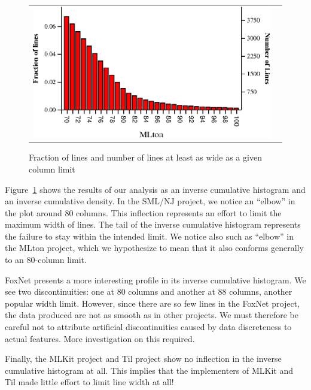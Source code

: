 \documentclass[12pt,abstracton]{scrartcl}
\begin{document}
\begin{figure}[h!]
\begin{tabular}{cc}
\includegraphics[scale=0.68]{mlton.eps} &
\end{tabular}
\caption{Fraction of lines and number of lines at least as wide as a given column limit}
\label{fig:width}
\end{figure}

Figure~\ref{fig:width} shows the results of our analysis
as an inverse cumulative histogram and an inverse cumulative density. In the SML/NJ project,
we notice an ``elbow'' in the plot around 80 columns. This inflection represents
an effort to limit the maximum width of lines. The tail of the inverse cumulative
histogram represents the failure to stay within the intended limit. We notice
also such as ``elbow'' in the MLton project, which we hypothesize
to mean that it also conforms generally to an 80-column limit.

FoxNet presents a more interesting profile in its inverse cumulative histogram. We see
two discontinuities: one at 80 columns and another at 88 columns, another popular width limit.
However, since there are so few lines in the FoxNet project, the data produced are
not as smooth as in other projects. We must therefore be careful not to attribute
artificial discontinuities caused by data discreteness to actual features. More
investigation on this required.

Finally, the MLKit project and Til project show no inflection in the
inverse cumulative histogram at all. This implies that the implementers of MLKit
and Til made little effort to limit line width at all!
\end{document}
